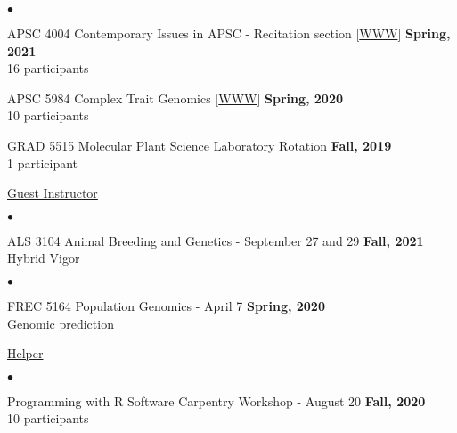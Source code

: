\documentclass[margin,line,10pt]{res}
\newenvironment{list2}{
  \begin{list}{$\bullet$}{%
      \setlength{\itemsep}{0in}
      \setlength{\parsep}{0in} \setlength{\parskip}{0in}
      \setlength{\topsep}{0in} \setlength{\partopsep}{0in} 
      \setlength{\leftmargin}{0.2in}}}{\end{list}}
\begin{document}
\begin{resume}
\begin{list2}
         \vspace{0.5cm}

         
  \item APSC 4004 Contemporary Issues in APSC - Recitation section [\textcolor{blue}{\href{http://morotalab.org/apsc4004-2021/syllabus4004-10730.pdf}{WWW}}] 
  \hfill {\bf Spring, 2021} \\
         16  participants 
  
         \vspace{0.5cm}
         
\item APSC 5984 Complex Trait Genomics [\textcolor{blue}{\href{http://morotalab.org/apsc5984-2020/APSC5984.html}{WWW}}] 
  \hfill {\bf Spring, 2020} \\
         10  participants %
  
     \vspace{0.5cm}

     
\item GRAD 5515 Molecular Plant Science Laboratory Rotation
  \hfill {\bf Fall, 2019} \\
  1 participant

\end{list2}

     \vspace{0.3cm}


\underline{Guest Instructor}

\vspace{0.4cm}
 \begin{list2}
 \item ALS 3104 Animal Breeding and Genetics  - September 27 and 29  \hfill {\bf Fall, 2021} \\
   Hybrid Vigor 
\end{list2}

  \vspace{0.3cm}

 
\vspace{0.4cm}
 \begin{list2}
 \item FREC 5164 Population Genomics - April 7  \hfill {\bf Spring, 2020} \\
   Genomic prediction
\end{list2}


 \vspace{0.3cm}


\underline{Helper}
 \vspace{0.4cm}
 \begin{list2}
 \item Programming with R Software Carpentry Workshop - August 20  \hfill {\bf Fall, 2020} \\
   10  participants 
\end{list2}


\end{resume}
\end{document}
